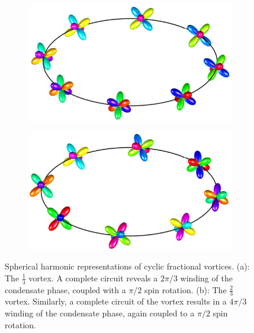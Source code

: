 \begin{figure}
    \centering
    \begin{subfigure}{0.49\textwidth}
        \includegraphics[width=\textwidth]
        {gfx/ch-groundStateSymmetries/one-third-vortex.pdf}
        \caption{}
    \end{subfigure}
    \begin{subfigure}{0.49\textwidth}
        \includegraphics[width=\textwidth]
        {gfx/ch-groundStateSymmetries/two-third-vortex.pdf}
        \caption{}
    \end{subfigure}
    \caption[Spherical harmonic representation of cyclic fractional vortices]
    {\label{fig: cyclic-fractional-spherical}Spherical harmonic
        representations of cyclic fractional vortices.
        (a): The \(\frac{1}{3}\) vortex. A complete circuit reveals a \(2\pi/3\)
        winding of the condensate phase, coupled with a \(\pi/2\) spin rotation.
        (b): The \(\frac{2}{3}\) vortex. Similarly, a complete circuit of the
        vortex results in a \(4\pi/3\) winding of the condensate phase, again
        coupled to a \(\pi/2\) spin rotation.}
\end{figure}

